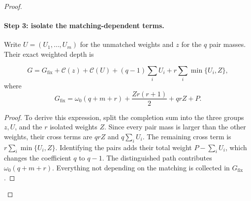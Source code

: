 \begin{proof}
\paragraph{Step 3: isolate the matching-dependent terms.}
Write $U=(U_1,\ldots,U_m)$ for the unmatched weights and $z$ for
the $q$ pair masses. Their exact weighted depth is
\begin{claim}
\begin{equation}\label{eq:expected-remaining-invoice}
 G=G_{\mathrm{fix}}+\mathcal C(z)+\mathcal C(U)
       +(q-1)\sum_i U_i+r\sum_i\min\{U_i,Z\},
\end{equation}
where
\[
 G_{\mathrm{fix}}=
 \omega_0(q+m+r)+\frac{Zr(r+1)}2+qrZ+P.
\]
\end{claim}
\begin{proof}
To derive this expression, split the completion sum into the
three groups $z,U$, and the $r$ isolated weights $Z$.
Since every pair mass is larger than the other weights, their
cross terms are $qrZ$ and $q\sum_iU_i$.
The remaining cross term is $r\sum_i\min\{U_i,Z\}$.
Identifying the pairs adds their total weight
$P-\sum_iU_i$, which changes the coefficient $q$ to $q-1$.
The distinguished path contributes $\omega_0(q+m+r)$.
Everything not depending on the matching is collected in
$G_{\mathrm{fix}}$.
\end{proof}


\end{proof}
